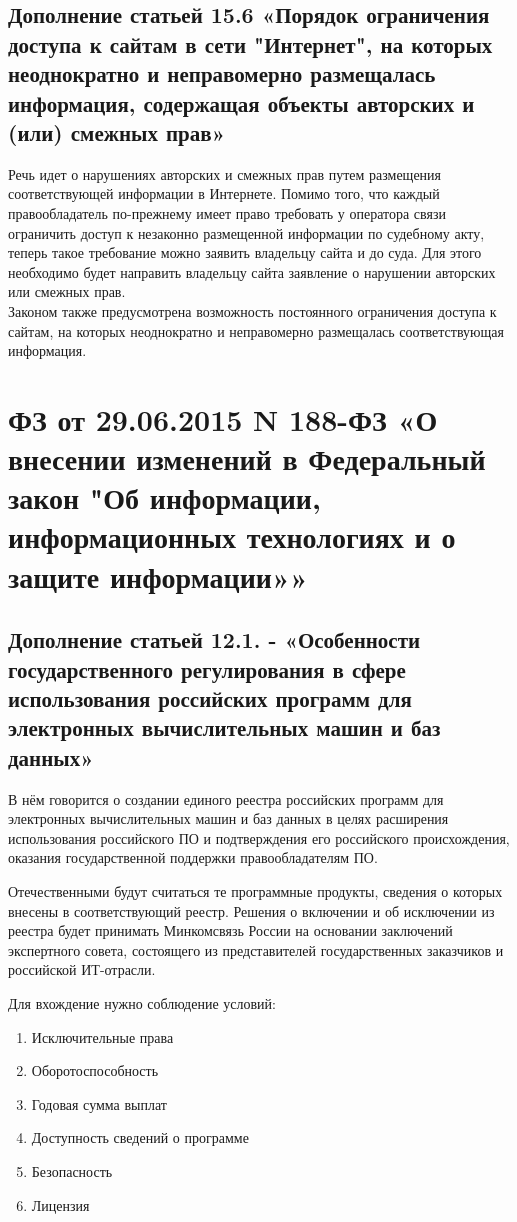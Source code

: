 \documentclass[14pt,a4paper,report]{article}
\begin{document}
\subsection{Дополнение статьей 15.6 «Порядок ограничения доступа к сайтам в сети "Интернет", на которых неоднократно и неправомерно размещалась информация, содержащая объекты авторских и (или) смежных прав»}

Речь идет о нарушениях авторских и смежных прав путем размещения соответствующей информации в Интернете. Помимо того, что каждый правообладатель по-прежнему имеет право требовать у оператора связи ограничить доступ к незаконно размещенной информации по судебному акту, теперь такое требование можно заявить владельцу сайта и до суда. Для этого необходимо будет направить владельцу сайта заявление о нарушении авторских или смежных прав.\\

Законом также предусмотрена возможность постоянного ограничения доступа к сайтам, на которых неоднократно и неправомерно размещалась соответствующая информация.

\section{ФЗ от 29.06.2015 N 188-ФЗ «О внесении изменений в Федеральный закон "Об информации, информационных технологиях и о защите информации»»}

\subsection{Дополнение статьей 12.1. - «Особенности государственного регулирования в сфере использования российских программ для электронных вычислительных машин и баз данных»}

В нём говорится о создании единого реестра российских программ для электронных вычислительных машин и баз данных в целях расширения использования российского ПО и подтверждения его российского происхождения, оказания государственной поддержки правообладателям ПО.

Отечественными будут считаться те программные продукты, сведения о которых внесены в соответствующий реестр. Решения о включении и об исключении из реестра будет принимать Минкомсвязь России на основании заключений экспертного совета, состоящего из представителей государственных заказчиков и российской ИТ-отрасли.

Для вхождение нужно соблюдение условий:
\begin{enumerate}
	\item Исключительные права	
	\item Оборотоспособность
	\item Годовая сумма выплат	
	\item Доступность сведений о программе	
	\item Безопасность	
	\item Лицензия	
\end{enumerate}
\end{document}
